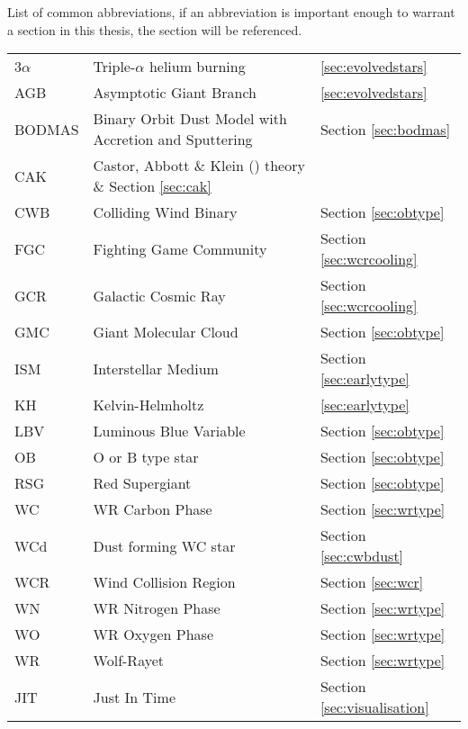\begin{abbreviations}
List of common abbreviations, if an abbreviation is important enough to warrant a section in this thesis, the section will be referenced.

\begin{table}[h]
  \centering
  \begin{tabular}{l|l|l}
    
    \hline

    3$\alpha$ & Triple-$\alpha$ helium burning & \ref{sec:evolvedstars} \\
    AGB & Asymptotic Giant Branch & \ref{sec:evolvedstars} \\
    BODMAS & Binary Orbit Dust Model with Accretion and Sputtering & Section \ref{sec:bodmas} \\
    CAK & Castor, Abbott \& Klein (\citeyear{castor_radiation-driven_1975}) theory \& Section \ref{sec:cak} \\
    CWB & Colliding Wind Binary  & Section \ref{sec:obtype} \\
    FGC & Fighting Game Community & Section \ref{sec:wcrcooling} \\
    GCR & Galactic Cosmic Ray & Section \ref{sec:wcrcooling} \\
    GMC & Giant Molecular Cloud & Section \ref{sec:obtype}\\
    ISM & Interstellar Medium & Section \ref{sec:earlytype} \\
    KH  & Kelvin-Helmholtz & \ref{sec:earlytype} \\ 
    LBV & Luminous Blue Variable & Section \ref{sec:obtype} \\
    OB  & O or B type star & Section \ref{sec:obtype} \\ 
    RSG & Red Supergiant & Section \ref{sec:obtype} \\
    WC  & WR Carbon Phase & Section \ref{sec:wrtype} \\
    WCd & Dust forming WC star & Section \ref{sec:cwbdust} \\
    WCR & Wind Collision Region & Section \ref{sec:wcr} \\
    WN  & WR Nitrogen Phase & Section \ref{sec:wrtype} \\
    WO  & WR Oxygen Phase & Section \ref{sec:wrtype} \\
    WR  & Wolf-Rayet & Section \ref{sec:wrtype} \\

    \hline

    JIT & Just In Time & Section \ref{sec:visualisation} \\

  \end{tabular} 
  \label{tbl:Abbreviations}
\end{table}



\end{abbreviations}
